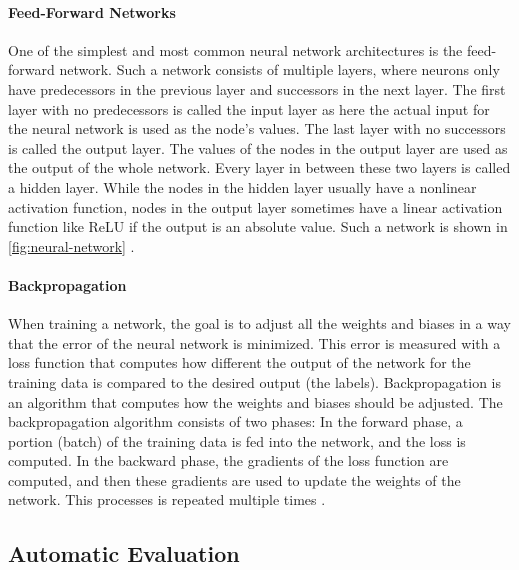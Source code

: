 \paragraph{Feed-Forward Networks}

One of the simplest and most common neural network architectures is the feed-forward network.
Such a network consists of multiple layers, where neurons only have predecessors in the previous layer and successors in the next layer.
The first layer with no predecessors is called the input layer as here the actual input for the neural network is used as the node's values.
The last layer with no successors is called the output layer.
The values of the nodes in the output layer are used as the output of the whole network.
Every layer in between these two layers is called a hidden layer.
While the nodes in the hidden layer usually have a nonlinear activation function, nodes in the output layer sometimes have a linear activation function like ReLU if the output is an absolute value. 
Such a network is shown in \cref{fig:neural-network} \cite[p.~17--20]{Aggarwal2018}.

\paragraph{Backpropagation}

When training a network, the goal is to adjust all the weights and biases in a way that the error of the neural network is minimized.
This error is measured with a loss function that computes how different the output of the network for the training data is compared to the desired output (the labels).
Backpropagation is an algorithm that computes how the weights and biases should be adjusted.
The backpropagation algorithm consists of two phases: In the forward phase, a portion (batch) of the training data is fed into the network, and the loss is computed.
In the backward phase, the gradients of the loss function are computed, and then these gradients are used to update the weights of the network.
This processes is repeated multiple times \cite[p.~21--24]{Aggarwal2018}.


\subsection{Automatic Evaluation}\label{ssec:automatic-evaluation}


